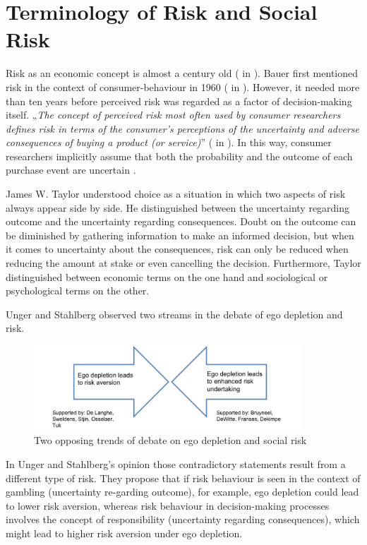 \section{Terminology of Risk and Social Risk}
Risk as an economic concept is almost a century old (\cite{knight1921risk} in \cite{dowling1994model}). Bauer first mentioned risk in the context of consumer-behaviour in 1960 (\cite{bauer1960consumer} in \cite{ross1975perceived}). However, it needed more than ten years before perceived risk was regarded as a factor of decision-making itself. „\emph{The concept of perceived risk most often used by consumer researchers defines risk in terms of the consumer's perceptions of the uncertainty and adverse consequences of buying a product (or service)}” (\cite{engel1973blackwell} in \cite{ross1975perceived}). In this way, consumer researchers implicitly assume that both the probability and the outcome of each purchase event are uncertain \citep{dowling1994model}.\par
James W. Taylor \citep{taylor1974role} understood choice as a situation in which two aspects of risk always appear side by side. He distinguished between the uncertainty regarding outcome and the uncertainty regarding consequences. Doubt on the outcome can be diminished by gathering information to make an informed decision, but when it comes to uncertainty about the consequences, risk can only be reduced when reducing the amount at stake or even cancelling the decision. Furthermore, Taylor distinguished between economic terms on the one hand and sociological or psychological terms on the other.\par
Unger and Stahlberg \citep{unger2011ego} observed two streams in the debate of ego depletion and risk. 
\begin{figure}[h!]
	\includegraphics[width=0.9\textwidth]{images/twostreams.png}
  \caption{Two opposing trends of debate on ego depletion and social risk \citep{unger2011ego}} \label{fig:twostreams}
\end{figure}
In Unger and Stahlberg’s opinion those contradictory statements result from a different type of risk. They propose that if risk behaviour is seen in the context of gambling (uncertainty re-garding outcome), for example, ego depletion could lead to lower risk aversion, whereas risk behaviour in decision-making processes involves the concept of responsibility (uncertainty regarding consequences), which might lead to higher risk aversion under ego depletion. \par
